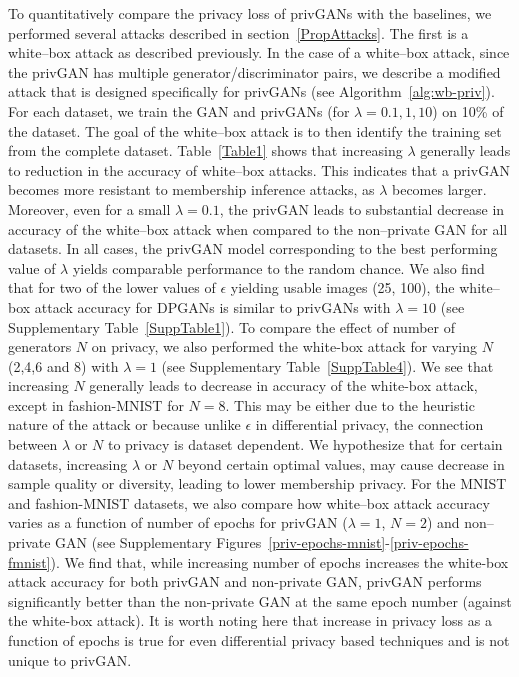 \documentclass{article}
\begin{document}
To quantitatively compare the privacy loss of privGANs with the baselines, we performed several attacks described in section~\ref{PropAttacks}.  The first is a white--box attack as described previously. In the case of a white--box attack, since the privGAN has multiple generator/discriminator pairs, we describe a modified attack that is designed specifically for privGANs (see Algorithm~\ref{alg:wb-priv}). For each dataset, we train the GAN and privGANs (for $\lambda= 0.1,1,10$) on 10\% of the dataset. The goal of the white--box attack is to then identify the training set from the complete dataset.  Table~\ref{Table1} shows that increasing $\lambda$ generally leads to reduction in the accuracy of white--box attacks. This indicates that a privGAN becomes more resistant to membership inference attacks, as $\lambda$ becomes larger. Moreover, even for a small $\lambda=0.1$, the privGAN leads to substantial decrease in accuracy of the white--box attack when compared to the non--private GAN for all datasets. In all cases, the privGAN model corresponding to the best performing value of $\lambda$ yields comparable performance to the random chance. We also find that for two of the lower values of $\epsilon$ yielding usable images (25, 100), the white--box attack accuracy for DPGANs is similar to privGANs with $\lambda=10$ (see Supplementary Table~\ref{SuppTable1}).  To compare the effect of number of generators $N$ on privacy, we also performed the white-box attack for varying $N$ (2,4,6 and 8) with  $\lambda = 1$ (see Supplementary Table~\ref{SuppTable4}). We see that increasing $N$ generally leads to decrease in accuracy of the white-box attack, except in fashion-MNIST for $N = 8$. This may be either due to the heuristic nature of the attack or because unlike $\epsilon$ in differential privacy, the connection between $\lambda$ or $N$ to privacy is dataset dependent. We hypothesize that for certain datasets, increasing $\lambda$ or $N$ beyond certain optimal values, may cause decrease in sample quality or diversity, leading to lower membership privacy.  For the MNIST and fashion-MNIST datasets, we also compare how white--box attack accuracy varies as a function of number of epochs for privGAN ($\lambda=1$, $N=2$) and non--private GAN (see Supplementary Figures~\ref{priv-epochs-mnist}-\ref{priv-epochs-fmnist}). We find that, while increasing number of epochs increases the white-box attack accuracy for both privGAN and non-private GAN, privGAN performs significantly better than the non-private GAN at the same epoch number (against the white-box attack).
It is worth noting here that increase in privacy loss as a function of epochs is true for even differential privacy based techniques and is not unique to privGAN. 
\end{document}
